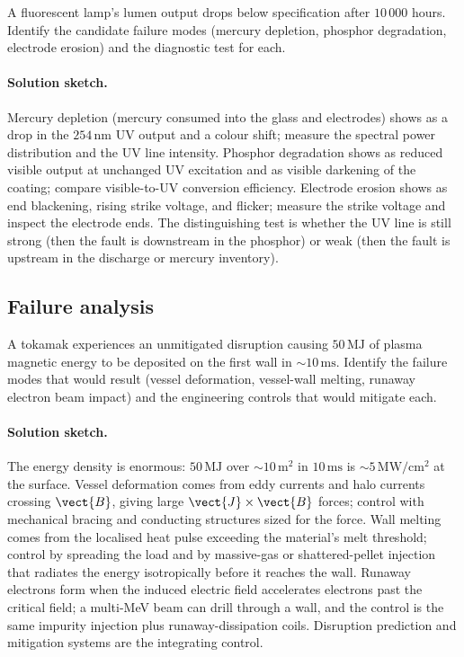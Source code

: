 \begin{exercise}
A fluorescent lamp's lumen output drops below specification after
$10\,000$ hours. Identify the candidate failure modes (mercury
depletion, phosphor degradation, electrode erosion) and the
diagnostic test for each.
\paragraph{Solution sketch.} Mercury depletion (mercury consumed into the
glass and electrodes) shows as a drop in the $254\,\si{\nano\meter}$ UV
output and a colour shift; measure the spectral power distribution and the
UV line intensity. Phosphor degradation shows as reduced visible output at
unchanged UV excitation and as visible darkening of the coating; compare
visible-to-UV conversion efficiency. Electrode erosion shows as end
blackening, rising strike voltage, and flicker; measure the strike voltage
and inspect the electrode ends. The distinguishing test is whether the UV
line is still strong (then the fault is downstream in the phosphor) or
weak (then the fault is upstream in the discharge or mercury inventory).
\end{exercise}

\subsection*{Failure analysis}

\begin{exercise}
A tokamak experiences an unmitigated disruption causing $50\,\si{
\mega\joule}$ of plasma magnetic energy to be deposited on the
first wall in $\sim 10\,\si{\milli\second}$. Identify the failure
modes that would result (vessel deformation, vessel-wall melting,
runaway electron beam impact) and the engineering controls that
would mitigate each.
\paragraph{Solution sketch.} The energy density is enormous: $50\,\si{
\mega\joule}$ over $\sim 10\,\si{\meter\squared}$ in $10\,\si{\milli
\second}$ is $\sim 5\,\si{\mega\watt\per\centi\meter\squared}$ at the
surface. Vessel deformation comes from eddy currents and halo currents
crossing $\vect{B}$, giving large $\vect{J}\times\vect{B}$ forces; control
with mechanical bracing and conducting structures sized for the force.
Wall melting comes from the localised heat pulse exceeding the material's
melt threshold; control by spreading the load and by massive-gas or
shattered-pellet injection that radiates the energy isotropically before
it reaches the wall. Runaway electrons form when the induced electric
field accelerates electrons past the critical field; a multi-MeV beam can
drill through a wall, and the control is the same impurity injection plus
runaway-dissipation coils. Disruption prediction and mitigation systems
are the integrating control.
\end{exercise}

